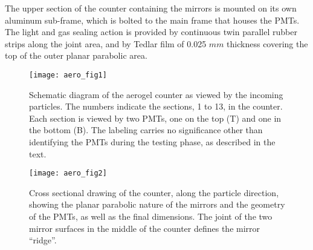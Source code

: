 {The upper section of the counter containing the mirrors is mounted on its
own aluminum sub-frame, which is bolted to the main frame that houses the PMTs. 
The light and gas sealing action is provided by continuous twin parallel rubber
strips along the joint area, and by Tedlar film of 0.025 $mm$ thickness
covering the top of the outer planar parabolic area. 
%
\begin{figure}[htb]
\begin{center}
  \texttt{[image: aero\_fig1]}
\end{center}
\caption[Aerogel:layout]{
 Schematic diagram of the aerogel \Cherenkov{} counter as viewed by the
 incoming particles.  The numbers indicate the sections, 1 to 13, in the
 counter. Each section is viewed by two PMTs, one on the top (T) and one in the
 bottom (B). The labeling carries no significance other than identifying the
 PMTs during the testing phase, as described in the text.
 }
\label{fig:aero_fig1}
\end{figure}

} %
\begin{figure}[htb]
\begin{center}
  \texttt{[image: aero\_fig2]}
\end{center}
\caption[Aerogel:mirrors]{
 Cross sectional drawing of the counter, along the particle direction, 
 showing the planar parabolic nature of the mirrors and the geometry of the 
 PMTs, as well as the final dimensions.  The joint of the two mirror surfaces in
 the middle of the counter defines the mirror ``ridge''.
 }
\label{fig:aero_fig2}
\end{figure}


